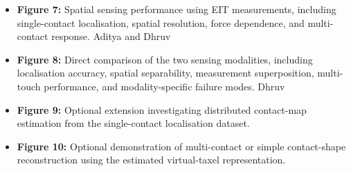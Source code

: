 \begin{itemize}
\item \textbf{Figure 7:} Spatial sensing performance using EIT
measurements, including single-contact localisation, spatial resolution,
force dependence, and multi-contact response. Aditya and Dhruv

\item \textbf{Figure 8:} Direct comparison of the two sensing modalities,
including localisation accuracy, spatial separability, measurement
superposition, multi-touch performance, and modality-specific failure
modes. Dhruv

\item \textbf{Figure 9:} Optional extension investigating distributed
contact-map estimation from the single-contact localisation dataset.

\item \textbf{Figure 10:} Optional demonstration of multi-contact or simple
contact-shape reconstruction using the estimated virtual-taxel
representation.


\end{itemize}
